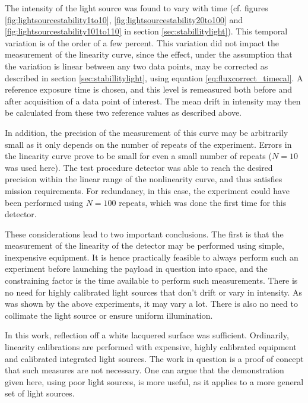 \documentclass[../main.tex]{subfiles}
\begin{document}
The intensity of the light source was found to vary with time (cf. figures \ref{fig:lightsourcestability1to10}, \ref{fig:lightsourcestability20to100} and \ref{fig:lightsourcestability101to110} in section \ref{sec:stabillitylight}). This temporal variation is of the order of a few percent. This variation did not impact the measurement of the linearity curve, since the effect, under the assumption that the variation is linear between any two data points, may be corrected as described in section \ref{sec:stabillitylight}, using equation \ref{eq:fluxcorrect_timecal}. A reference exposure time is chosen, and this level is remeasured both before and after acquisition of a data point of interest. The mean drift in intensity may then be calculated from these two reference values as described above.

In addition, the precision of the measurement of this curve may be arbitrarily small as it only depends on the number of repeats of the experiment. Errors in the linearity curve prove to be small for even a small number of repeats ($N=10$ was used here). The test procedure detector was able to reach the desired precision within the linear range of the nonlinearity curve, and thus satisfies mission requirements. For redundancy, in this case, the experiment could have been performed using $N=100$ repeats, which was done the first time for this detector. 

These considerations lead to two important conclusions. The first is that the measurement of the linearity of the detector may be performed using simple, inexpensive equipment. It is hence practically feasible to always perform such an experiment before launching the payload in question into space, and the constraining factor is the time available to perform such measurements. There is no need for highly calibrated light sources that don't drift or vary in intensity. As was shown by the above experiments, it may vary a lot. There is also no need to collimate the light source or ensure uniform illumination. 

In this work, reflection off a white lacquered surface was sufficient. Ordinarily, linearity calibrations are performed with expensive, highly calibrated equipment and calibrated integrated light sources. The work in question is a proof of concept that such measures are not necessary. One can argue that the demonstration given here,  using poor light sources, is more useful, as it applies to a more general set of light sources. 
\end{document}
